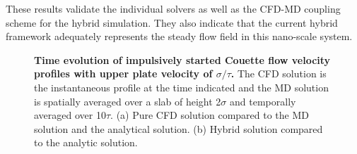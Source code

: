 \documentclass[preprint,12pt]{elsarticle}
\begin{document}
These results validate the individual solvers as well as the CFD-MD coupling scheme for the hybrid simulation. They also indicate that the current hybrid framework adequately represents the steady flow field in this nano-scale system. 


\begin{figure}
\centering
{}
\hskip 1cm
\vskip-0.2cm
\caption[]{\small {\bf Time evolution of impulsively started Couette flow velocity profiles with upper plate velocity of  $\sigma/\tau$.} The CFD solution is the instantaneous profile at the time indicated and the MD solution is spatially averaged over a slab of height 2$\sigma$ and temporally averaged over 10$\tau$. (a) Pure CFD solution compared to the MD solution and the analytical solution. (b) Hybrid solution compared to the analytic solution.
}
\label{Flat_Plate_Sol}
\end{figure}
\end{document}
